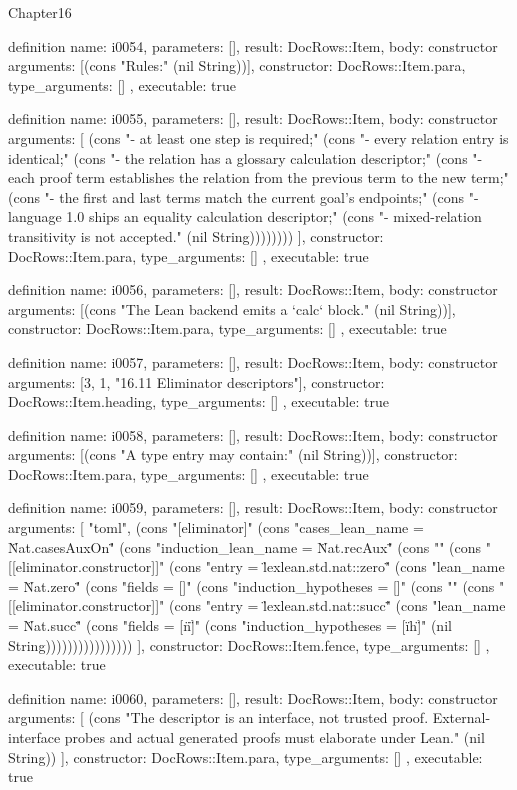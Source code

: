 \begin{lexlean}{Chapter16}
\begin{semanticmodule}
definition{
  name: i0054,
  parameters: [],
  result: DocRows::Item,
  body: constructor{
    arguments: [(cons "Rules:" (nil String))],
    constructor: DocRows::Item.para,
    type_arguments: []
  },
  executable: true
}

definition{
  name: i0055,
  parameters: [],
  result: DocRows::Item,
  body: constructor{
    arguments: [
      (cons "- at least one step is required;" (cons "- every relation entry is identical;" (cons "- the relation has a glossary calculation descriptor;" (cons "- each proof term establishes the relation from the previous term to the new term;" (cons "- the first and last terms match the current goal's endpoints;" (cons "- language 1.0 ships an equality calculation descriptor;" (cons "- mixed-relation transitivity is not accepted." (nil String))))))))
    ],
    constructor: DocRows::Item.para,
    type_arguments: []
  },
  executable: true
}

definition{
  name: i0056,
  parameters: [],
  result: DocRows::Item,
  body: constructor{
    arguments: [(cons "The Lean backend emits a `calc` block." (nil String))],
    constructor: DocRows::Item.para,
    type_arguments: []
  },
  executable: true
}

definition{
  name: i0057,
  parameters: [],
  result: DocRows::Item,
  body: constructor{
    arguments: [3, 1, "16.11 Eliminator descriptors"],
    constructor: DocRows::Item.heading,
    type_arguments: []
  },
  executable: true
}

definition{
  name: i0058,
  parameters: [],
  result: DocRows::Item,
  body: constructor{
    arguments: [(cons "A type entry may contain:" (nil String))],
    constructor: DocRows::Item.para,
    type_arguments: []
  },
  executable: true
}

definition{
  name: i0059,
  parameters: [],
  result: DocRows::Item,
  body: constructor{
    arguments: [
      "toml",
      (cons "[eliminator]" (cons "cases_lean_name = \"Nat.casesAuxOn\"" (cons "induction_lean_name = \"Nat.recAux\"" (cons "" (cons "[[eliminator.constructor]]" (cons "entry = \"lexlean.std.nat::zero\"" (cons "lean_name = \"Nat.zero\"" (cons "fields = []" (cons "induction_hypotheses = []" (cons "" (cons "[[eliminator.constructor]]" (cons "entry = \"lexlean.std.nat::succ\"" (cons "lean_name = \"Nat.succ\"" (cons "fields = [\"n\"]" (cons "induction_hypotheses = [\"ih\"]" (nil String))))))))))))))))
    ],
    constructor: DocRows::Item.fence,
    type_arguments: []
  },
  executable: true
}

definition{
  name: i0060,
  parameters: [],
  result: DocRows::Item,
  body: constructor{
    arguments: [
      (cons "The descriptor is an interface, not trusted proof. External-interface probes and actual generated proofs must elaborate under Lean." (nil String))
    ],
    constructor: DocRows::Item.para,
    type_arguments: []
  },
  executable: true
}


\end{semanticmodule}
\end{lexlean}
